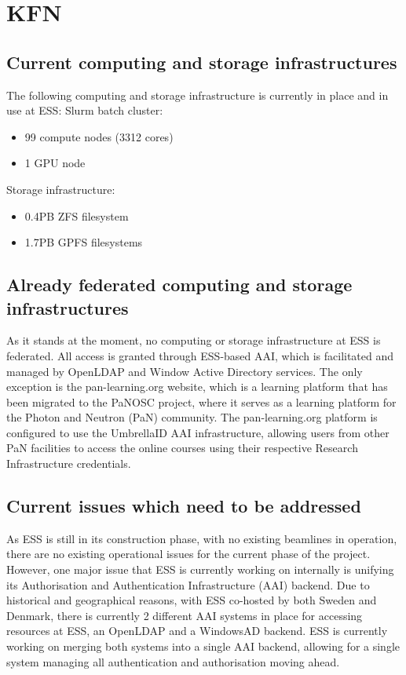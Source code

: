 \section{KFN}


\subsection{Current computing and storage infrastructures}

The following computing and storage infrastructure is currently in place and in use at ESS:
Slurm batch cluster:

\begin{itemize}
  \item 99 compute nodes (3312 cores)
  \item 1 GPU node
\end{itemize}

Storage infrastructure:

\begin{itemize}
  \item 0.4PB ZFS filesystem
  \item 1.7PB GPFS filesystems
\end{itemize}

\subsection{Already federated computing and storage infrastructures}

As it stands at the moment, no computing or storage infrastructure at ESS is federated.
All access is granted through ESS-based AAI, which is facilitated and managed by OpenLDAP and Window Active Directory services.
The only exception is the pan-learning.org website, which is a learning platform that has been migrated to the PaNOSC project, where it serves as a learning platform for the Photon and Neutron (PaN) community.
The pan-learning.org platform is configured to use the UmbrellaID AAI infrastructure, allowing users from other PaN facilities to access the online courses using their respective Research Infrastructure credentials.

\subsection{Current issues which need to be addressed}

As ESS is still in its construction phase, with no existing beamlines in operation, there are no existing operational issues for the current phase of the project.
However, one major issue that ESS is currently working on internally is unifying its Authorisation and Authentication Infrastructure (AAI) backend.
Due to historical and geographical reasons, with ESS co-hosted by both Sweden and Denmark, there is currently 2 different AAI systems in place for accessing resources at ESS, an OpenLDAP and a WindowsAD backend.
ESS is currently working on merging both systems into a single AAI backend, allowing for a single system managing all authentication and authorisation moving ahead.

